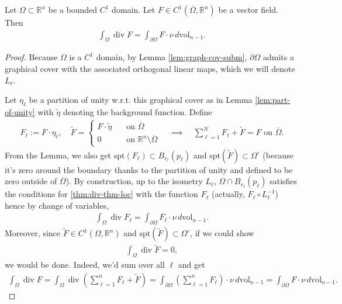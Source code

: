 \begin{theorem}\label{thm:div-thm}
	Let $\Omega \subset \mathbb{R}^{n}$ be a bounded $C^{1}$ domain. Let $F \in C^{1}(\overline{ \Omega }, \mathbb{R}^{n} )$ be a vector field. Then
	\begin{align*}
		\int_{\Omega} \operatorname{div}F = \int_{\partial \Omega} F \cdot \nu \, d \text{vol}_{n-1}.
	\end{align*}
\end{theorem}
\begin{proof}
	Because $\Omega$ is a $C^{1}$ domain, by Lemma \ref{lem:graph-cov-subm}, $\partial \Omega$ admits a graphical cover with the associated orthogonal linear maps, which we will denote $L_{\ell}$. 

	Let $\eta_{\ell}$ be a partition of unity w.r.t. this graphical cover as in Lemma \ref{lem:part-of-unity} with $\tilde{\eta}$ denoting the background function. Define
	\begin{align*}
		F_{\ell} := F \cdot \eta_{\ell}, \quad \tilde{F} =
		\begin{cases}
			F\cdot \tilde{\eta} \quad & \text{on } \overline{ \Omega }                          \\
			0 \quad              & \text{on } \mathbb{R}^{n} \setminus \overline{ \Omega }
		\end{cases} \quad \implies \quad
		\sum_{\ell=1}^{N} F_{\ell} + \tilde{F} = F \text{ on } \overline{ \Omega }.
	\end{align*}
	From the Lemma, we also get $\text{spt}(F_{\ell}) \subset B_{r_{\ell}}(p_{\ell})$ and $\text{spt}(\tilde{F}) \subset \Omega^{\circ}$ (because it's zero around the boundary thanks to the partition of unity and defined to be zero outside of $\overline{ \Omega } $). By construction, up to the isometry $L_{\ell}$, $\Omega \cap B_{r_{\ell}}(p_{\ell})$ satisfies the conditions for \ref{thm:div-thm-loc} with the function $F_{\ell}$ (actually, $F_{\ell} \circ L^{-1}_{\ell}$) hence by change of variables, 
	\begin{align*}
		\int_{\Omega} \operatorname{div}F_{\ell} = \int_{\partial\Omega} F_{\ell} \cdot \nu  \, d \text{vol}_{n-1}.
	\end{align*}
	Moreover, since $\tilde{F} \in C^{1}(\Omega, \mathbb{R}^{n})$ and $\text{spt}(\tilde{F}) \subset \Omega^{\circ }$, if we could show
	\begin{align*}
		\int_{\Omega} \operatorname{div} \tilde{F} = 0,
	\end{align*}
	we would be done. Indeed, we'd sum over all $\ell$ and get
	\begin{align*}
		\int_{\Omega} \operatorname{div}F = \int_{\Omega} \operatorname{div}\left( \sum_{\ell=1}^{n} F_{\ell} + \tilde{F}  \right)  = \int_{\partial \Omega} \left( \sum_{\ell=1}^{n} F_{\ell} \right) \cdot \nu \, d \text{vol}_{n-1} = \int_{\partial \Omega} F \cdot \nu \, d \text{vol}_{n-1}.
	\end{align*}


\end{proof}
